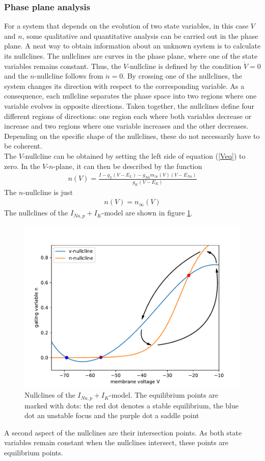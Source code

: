 \documentclass[12pt,a4paper]{article}
\begin{document}
\subsubsection{Phase plane analysis}
For a system that depends on the evolution of two state variables, in this case $V$ and $n$, some qualitative and quantitative analysis can be carried out in the phase plane. A neat way to obtain information about an unknown system is to calculate its nullclines. The nullclines are curves in the phase plane, where one of the state variables remains constant. Thus, the $V$-nullcline is defined by the condition $\dot{V}=0$ and the $n$-nullcline follows from $\dot{n}=0$. By crossing one of the nullclines, the system changes its direction with respect to the corresponding variable. As a consequence, each nullcline separates the phase space into two regions where one variable evolves in opposite directions. Taken together, the nullclines define four different regions of directions: one region each where both variables decrease or increase and two regions where one variable increases and the other decreases. Depending on the specific shape of the nullclines, these do not necessarily have to be coherent.\\
The $V$-nullcline can be obtained by setting the left side of equation (\ref{Veq}) to zero. In the $V$-$n$-plane, it can then be described by the function
\begin{align}
n(V)=\frac{I - g_L(V-E_L) - g_{Na}m_{\infty}(V)(V-E_{Na})}{g_K(V-E_K)}
\end{align} 
The $n$-nullcline is just
\begin{align}
n(V)=n_\infty(V)
\end{align}
The nullclines of the $I_{Na,p}+I_K$-model are shown in figure \ref{realnc}.\\
\begin{figure}[H]
	\centering
	\includegraphics[scale=0.5]{inapikrealncwn.pdf}\caption{Nullclines of the $I_{Na,p}+I_K$-model. The equilibrium points are marked with dots: the red dot denotes a stable equilibrium, the blue dot an unstable focus and the purple dot a saddle point}
	\label{realnc}
\end{figure}
A second aspect of the nullclines are their intersection points. As both state variables remain constant when the nullclines intersect, these points are equilibrium points.



\end{document}
